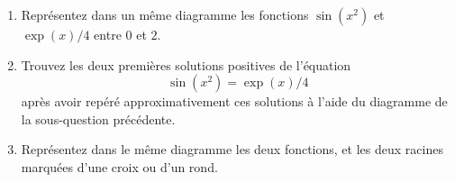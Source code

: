 \begin{exercice}\label{exoMatlab0021}

\begin{enumerate}
\item Représentez dans un même diagramme les fonctions $\sin(x^2)$ et $\exp(x)/4$ entre $0$ et $2$.
\item Trouvez les deux premières solutions positives de l'équation
\[ \sin(x^2) = \exp(x)/4 \]
après avoir repéré approximativement ces solutions à l'aide du diagramme de la sous-question précédente.
\item Représentez dans le même diagramme les deux fonctions, et les deux racines marquées d'une croix ou d'un rond. 
\end{enumerate}

\end{exercice}
